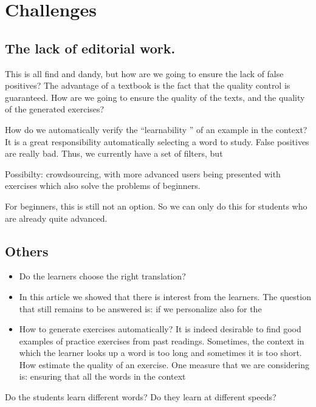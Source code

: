 
\newpage
\section{Challenges}

\subsection{The lack of editorial work.}
This is all find and dandy, but how are we going to ensure the lack of false positives? The advantage of a textbook is the fact that the quality control is guaranteed. How are we going to ensure the quality of the texts, and the quality of the generated exercises? 

How do we automatically verify the ``learnability '' of an example in the context? It is a great responsibility automatically selecting a word to study. False positives are really bad. Thus, we currently have a set of filters, but 

Possibilty: crowdsourcing, with more advanced users being presented with exercises which also solve the problems of beginners. 

For beginners, this is still not an option. So we can only do this for students who are already quite advanced. 





\subsection{Others}
\begin{itemize}
	\item Do the learners choose the right translation? 
	\item In this article we showed that there is interest from the learners. The question that still remains to be answered is: if we personalize also for the 
	\item How to generate exercises automatically? It is indeed desirable to find good examples of practice exercises from past readings. Sometimes, the context in which the learner looks up a word is too long and sometimes it is too short. How estimate the quality of an exercise. One measure that we are considering is: ensuring that all the words in the context  
\end{itemize}

Do the students learn different words? Do they learn at different speeds? 


